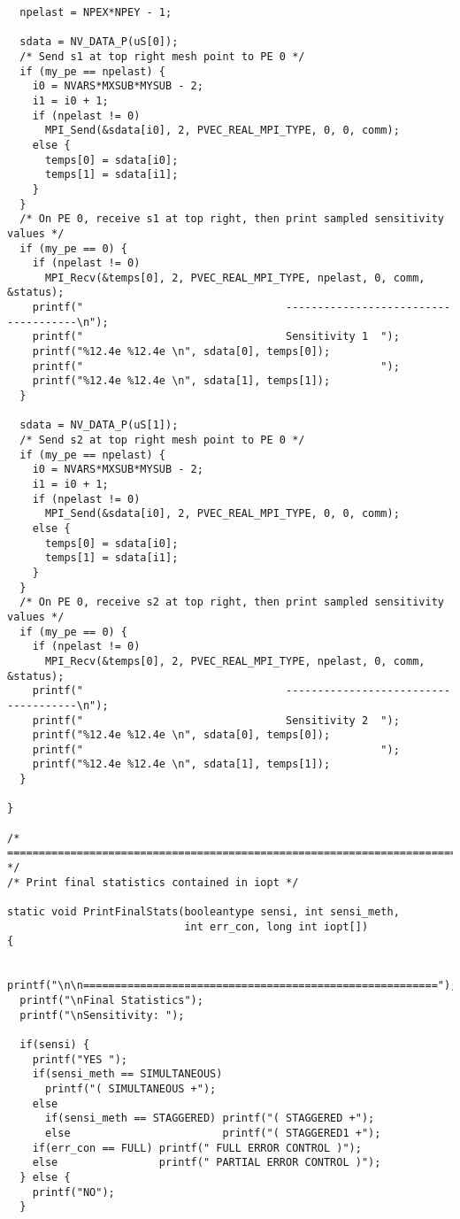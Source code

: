 \begin{verbatim}
  npelast = NPEX*NPEY - 1;

  sdata = NV_DATA_P(uS[0]);
  /* Send s1 at top right mesh point to PE 0 */
  if (my_pe == npelast) {
    i0 = NVARS*MXSUB*MYSUB - 2;
    i1 = i0 + 1;
    if (npelast != 0)
      MPI_Send(&sdata[i0], 2, PVEC_REAL_MPI_TYPE, 0, 0, comm);
    else {
      temps[0] = sdata[i0];
      temps[1] = sdata[i1];
    }
  }
  /* On PE 0, receive s1 at top right, then print sampled sensitivity values */ 
  if (my_pe == 0) {
    if (npelast != 0)
      MPI_Recv(&temps[0], 2, PVEC_REAL_MPI_TYPE, npelast, 0, comm, &status);
    printf("                                -------------------------------------\n");
    printf("                                Sensitivity 1  ");
    printf("%12.4e %12.4e \n", sdata[0], temps[0]); 
    printf("                                               ");
    printf("%12.4e %12.4e \n", sdata[1], temps[1]);
  }

  sdata = NV_DATA_P(uS[1]);
  /* Send s2 at top right mesh point to PE 0 */
  if (my_pe == npelast) {
    i0 = NVARS*MXSUB*MYSUB - 2;
    i1 = i0 + 1;
    if (npelast != 0)
      MPI_Send(&sdata[i0], 2, PVEC_REAL_MPI_TYPE, 0, 0, comm);
    else {
      temps[0] = sdata[i0];
      temps[1] = sdata[i1];
    }
  }
  /* On PE 0, receive s2 at top right, then print sampled sensitivity values */ 
  if (my_pe == 0) {
    if (npelast != 0)
      MPI_Recv(&temps[0], 2, PVEC_REAL_MPI_TYPE, npelast, 0, comm, &status);
    printf("                                -------------------------------------\n");
    printf("                                Sensitivity 2  ");
    printf("%12.4e %12.4e \n", sdata[0], temps[0]); 
    printf("                                               ");
    printf("%12.4e %12.4e \n", sdata[1], temps[1]);
  }

}

/* ======================================================================= */
/* Print final statistics contained in iopt */

static void PrintFinalStats(booleantype sensi, int sensi_meth, 
                            int err_con, long int iopt[])
{

  printf("\n\n========================================================");
  printf("\nFinal Statistics");
  printf("\nSensitivity: ");

  if(sensi) {
    printf("YES ");
    if(sensi_meth == SIMULTANEOUS)   
      printf("( SIMULTANEOUS +");
    else 
      if(sensi_meth == STAGGERED) printf("( STAGGERED +");
      else                        printf("( STAGGERED1 +");                      
    if(err_con == FULL) printf(" FULL ERROR CONTROL )");
    else                printf(" PARTIAL ERROR CONTROL )");
  } else {
    printf("NO");
  }


\end{verbatim}
